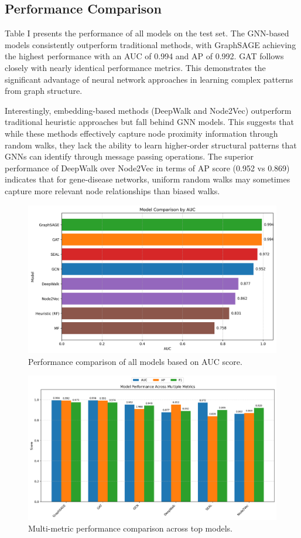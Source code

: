 \documentclass[conference]{IEEEtran}
\begin{document}
\subsection{Performance Comparison}
Table I presents the performance of all models on the test set. The GNN-based models consistently outperform traditional methods, with GraphSAGE achieving the highest performance with an AUC of 0.994 and AP of 0.992. GAT follows closely with nearly identical performance metrics. This demonstrates the significant advantage of neural network approaches in learning complex patterns from graph structure.

Interestingly, embedding-based methods (DeepWalk and Node2Vec) outperform traditional heuristic approaches but fall behind GNN models. This suggests that while these methods effectively capture node proximity information through random walks, they lack the ability to learn higher-order structural patterns that GNNs can identify through message passing operations. The superior performance of DeepWalk over Node2Vec in terms of AP score (0.952 vs 0.869) indicates that for gene-disease networks, uniform random walks may sometimes capture more relevant node relationships than biased walks.

\begin{figure}[!t]
\centering
\includegraphics[width=0.9\columnwidth]{figures/model_comparison.png}
\caption{Performance comparison of all models based on AUC score.}
\label{fig:model_comparison}
\end{figure}

\begin{figure}[!t]
\centering
\includegraphics[width=0.9\columnwidth]{figures/multi_metric_comparison.png}
\caption{Multi-metric performance comparison across top models.}
\label{fig:multi_metric}
\end{figure}
\end{document}
